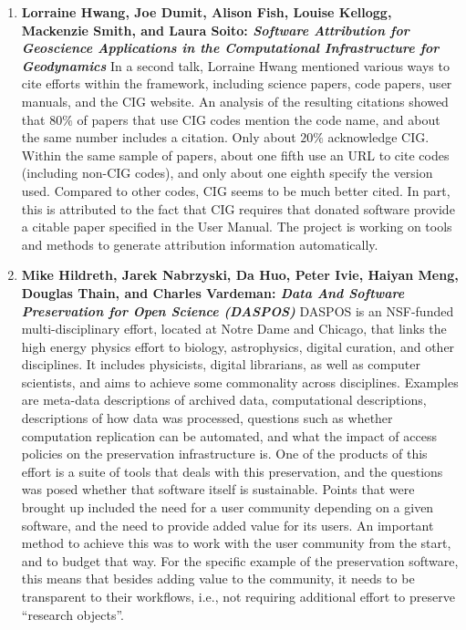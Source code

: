 \documentclass[11pt, oneside]{amsart}
\begin{document}
\begin{enumerate}
\item \textbf{Lorraine Hwang, Joe Dumit, Alison Fish, Louise Kellogg, Mackenzie
Smith, and Laura Soito: \textit{Software Attribution for Geoscience Applications
in the Computational Infrastructure for Geodynamics}} In a second talk, Lorraine
Hwang mentioned various ways to cite efforts within the framework, including
science papers, code papers, user manuals, and the CIG website. An analysis of
the resulting citations showed that $80\%$ of papers that use CIG codes mention
the code name, and about the same number includes a citation. Only about $20\%$
acknowledge CIG. Within the same sample of papers, about one fifth use an URL to
cite codes (including non-CIG codes), and only about one eighth specify the
version used. Compared to other codes, CIG seems to be much better cited. 
In part, this is attributed to the fact that CIG requires that donated software provide a citable paper specified in the User Manual. 
The project is working on tools and methods to generate attribution information automatically.

\item \textbf{Mike Hildreth, Jarek Nabrzyski, Da Huo, Peter Ivie, Haiyan Meng,
Douglas Thain, and Charles Vardeman: \textit{Data And Software Preservation for
Open Science (DASPOS)}} DASPOS is an NSF-funded multi-disciplinary effort,
located at Notre Dame and Chicago, that links the high energy physics effort to
biology, astrophysics, digital curation, and other disciplines. It includes
physicists, digital librarians, as well as computer scientists, and aims to
achieve some commonality across disciplines. Examples are meta-data descriptions
of archived data, computational descriptions, descriptions of how data was
processed, questions such as whether computation replication can be automated,
and what the impact of access policies on the preservation infrastructure is.
One of the products of this effort is a suite of tools that deals with this
preservation, and the questions was posed whether that software itself is
sustainable. Points that were brought up included the need for a user community
depending on a given software, and the need to provide added value for its
users. An important method to achieve this was to work with the user community
from the start, and to budget that way. For the specific example of the
preservation software, this means that besides adding value to the community, it
needs to be transparent to their workflows, i.e., not requiring additional
effort to preserve ``research objects''.


\end{enumerate}
\end{document}

